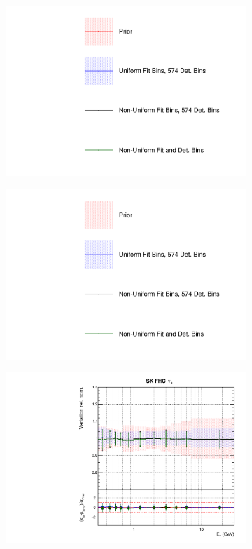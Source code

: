 \begin{figure}[!htbp]
\centering
\begin{subfigure}{0.3\textwidth}
  \centering
  \includegraphics[width=1.0\linewidth,  trim={5mm  80mm 0mm 0mm}, clip]{figs/polyasmvs_leg}
\end{subfigure}
\begin{subfigure}{0.3\textwidth}
  \centering
  \includegraphics[width=1.0\linewidth,  trim={5mm  0mm 0mm 95mm}, clip]{figs/polyasmvs_leg}
\end{subfigure}
\begin{subfigure}{0.45\textwidth}
  \centering
  \includegraphics[width=0.75\linewidth]{figs/polyasmvsflux_8}

\end{subfigure}
\end{figure}
